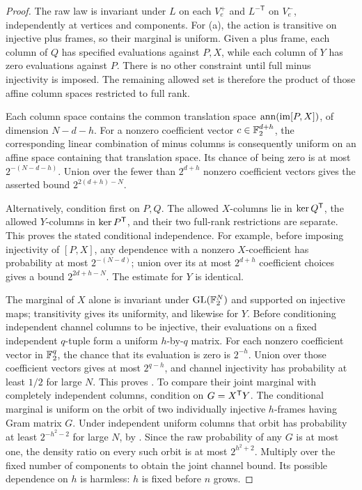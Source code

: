 \begin{proof}
The raw law is invariant under \(L\) on each \(V_e^+\) and \(L^{-\mathsf T}\) on \(V_e^-\), independently at vertices and components.
For (a), the action is transitive on injective plus frames, so their marginal is uniform.
Given a plus frame, each column of \(Q\) has specified evaluations against \(P,X\), while each column of \(Y\) has zero evaluations against \(P\).
There is no other constraint until full minus injectivity is imposed.
The remaining allowed set is therefore the product of those affine column spaces restricted to full rank.

Each column space contains the common translation space
\(\operatorname{ann}(\operatorname{im}[P,X])\), of dimension \(N-d-h\).
For a nonzero coefficient vector \(c\in\mathbb F_2^{d+h}\), the corresponding linear combination of minus columns is consequently uniform on an affine space containing that translation space.
Its chance of being zero is at most \(2^{-(N-d-h)}\).
Union over the fewer than \(2^{d+h}\) nonzero coefficient vectors gives the asserted bound \(2^{2(d+h)-N}\).

Alternatively, condition first on \(P,Q\).
The allowed \(X\)-columns lie in \(\ker Q^{\mathsf T}\), the allowed \(Y\)-columns in \(\ker P^{\mathsf T}\), and their two full-rank restrictions are separate.
This proves the stated conditional independence.
For example, before imposing injectivity of \([P,X]\), any dependence with a nonzero \(X\)-coefficient has probability at most \(2^{-(N-d)}\); union over its at most \(2^{d+h}\) coefficient choices gives a bound \(2^{2d+h-N}\).
The estimate for \(Y\) is identical.

The marginal of \(X\) alone is invariant under \(\operatorname{GL}(\mathbb F_2^N)\) and supported on injective maps; transitivity gives its uniformity, and likewise for \(Y\).
Before conditioning independent channel columns to be injective, their evaluations on a fixed independent \(q\)-tuple form a uniform \(h\)-by-\(q\) matrix.
For each nonzero coefficient vector in \(\mathbb F_2^q\), the chance that its evaluation is zero is \(2^{-h}\).
Union over those coefficient vectors gives at most \(2^{q-h}\), and channel injectivity has probability at least \(1/2\) for large \(N\).
This proves .
To compare their joint marginal with completely independent columns, condition on \(G=X^{\mathsf T} Y\).
The conditional marginal is uniform on the orbit of two individually injective \(h\)-frames having Gram matrix \(G\).
Under independent uniform columns that orbit has probability at least \(2^{-h^2-2}\) for large \(N\), by .
Since the raw probability of any \(G\) is at most one, the density ratio on every such orbit is at most \(2^{h^2+2}\).
Multiply over the fixed number of components to obtain the joint channel bound.
Its possible dependence on \(h\) is harmless: \(h\) is fixed before \(n\) grows.


\end{proof}
